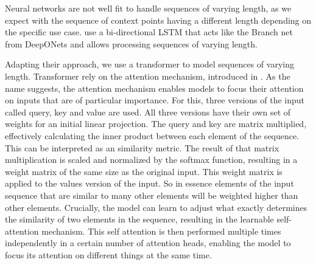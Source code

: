 Neural networks are not well fit to handle sequences of varying length, as we expect with the sequence of context points having a different length depending on the specific use case. \citet{seifner2025zeroshotimputationfoundationinference} use a bi-directional LSTM that acts like the Branch net from DeepONets and allows processing sequences of varying length. 

Adapting their approach, we use a transformer to model sequences of varying length. Transformer rely on the attention mechanism, introduced in \citet{vaswani2017attention}. As the name suggests, the attention mechanism enables models to focus their attention on inputs that are of particular importance. For this, three versions of the input called query, key and value are used. All three versions have their own set of weights for an initial linear projection. The query and key are matrix multiplied, effectively calculating the inner product between each element of the sequence. This can be interpreted as an similarity metric. The result of that matrix multiplication is scaled and normalized by the softmax function, resulting in a weight matrix of the same size as the original input. This weight matrix is applied to the values version of the input. So in essence elements of the input sequence that are similar to many other elements will be weighted higher than other elements. Crucially, the model can learn to adjust what exactly determines the similarity of two elements in the sequence, resulting in the learnable self-attention mechanism. This self attention is then performed multiple times independently in a certain number of attention heads, enabling the model to focus its attention on different things at the same time. \cite{vaswani2017attention}